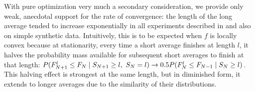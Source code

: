 \documentclass[twocolumn]{article}
\begin{document}
\begin{appendices}
With pure optimization very much a secondary consideration, we provide only weak, anecdotal support for the rate of convergence: the length of the long average tended to increase exponentially in all experiments described in  and also on simple synthetic data.
Intuitively, this is to be expected when $f$ is locally convex because at stationarity, every time a short average finishes at length $l$, it halves the probability mass available for subsequent short averages to finish at that length: $P(\smash{F^l_{N+1}} \leq F_N \mid S_{N+1} \geq l,\ S_N = l) \to 0.5 P(\smash{F^l_N} \leq F_{N-1} \mid S_N \geq l)$.
This halving effect is strongest at the same length, but in diminished form, it extends to longer averages due to the similarity of their distributions.

\end{appendices}
\end{document}
